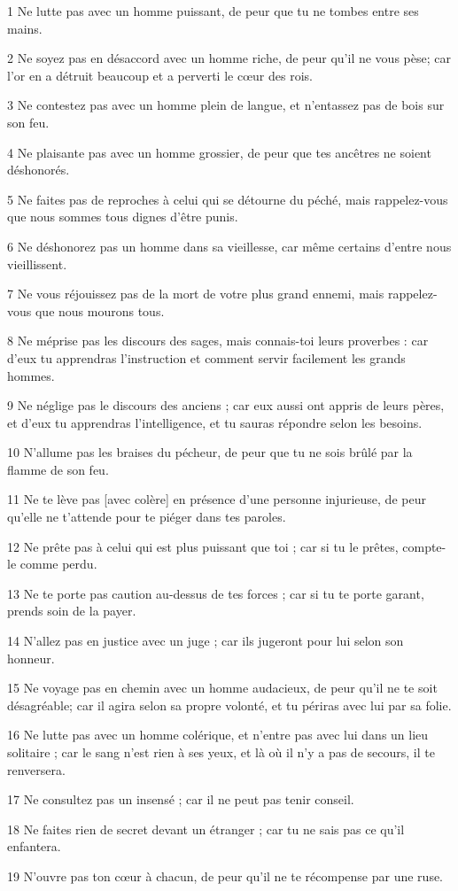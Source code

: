 \par 1 Ne lutte pas avec un homme puissant, de peur que tu ne tombes entre ses mains.
\par 2 Ne soyez pas en désaccord avec un homme riche, de peur qu'il ne vous pèse; car l'or en a détruit beaucoup et a perverti le cœur des rois.
\par 3 Ne contestez pas avec un homme plein de langue, et n'entassez pas de bois sur son feu.
\par 4 Ne plaisante pas avec un homme grossier, de peur que tes ancêtres ne soient déshonorés.
\par 5 Ne faites pas de reproches à celui qui se détourne du péché, mais rappelez-vous que nous sommes tous dignes d'être punis.
\par 6 Ne déshonorez pas un homme dans sa vieillesse, car même certains d'entre nous vieillissent.
\par 7 Ne vous réjouissez pas de la mort de votre plus grand ennemi, mais rappelez-vous que nous mourons tous.
\par 8 Ne méprise pas les discours des sages, mais connais-toi leurs proverbes : car d'eux tu apprendras l'instruction et comment servir facilement les grands hommes.
\par 9 Ne néglige pas le discours des anciens ; car eux aussi ont appris de leurs pères, et d'eux tu apprendras l'intelligence, et tu sauras répondre selon les besoins.
\par 10 N'allume pas les braises du pécheur, de peur que tu ne sois brûlé par la flamme de son feu.
\par 11 Ne te lève pas [avec colère] en présence d'une personne injurieuse, de peur qu'elle ne t'attende pour te piéger dans tes paroles.
\par 12 Ne prête pas à celui qui est plus puissant que toi ; car si tu le prêtes, compte-le comme perdu.
\par 13 Ne te porte pas caution au-dessus de tes forces ; car si tu te porte garant, prends soin de la payer.
\par 14 N'allez pas en justice avec un juge ; car ils jugeront pour lui selon son honneur.
\par 15 Ne voyage pas en chemin avec un homme audacieux, de peur qu'il ne te soit désagréable; car il agira selon sa propre volonté, et tu périras avec lui par sa folie.
\par 16 Ne lutte pas avec un homme colérique, et n'entre pas avec lui dans un lieu solitaire ; car le sang n'est rien à ses yeux, et là où il n'y a pas de secours, il te renversera.
\par 17 Ne consultez pas un insensé ; car il ne peut pas tenir conseil.
\par 18 Ne faites rien de secret devant un étranger ; car tu ne sais pas ce qu'il enfantera.
\par 19 N'ouvre pas ton cœur à chacun, de peur qu'il ne te récompense par une ruse.

